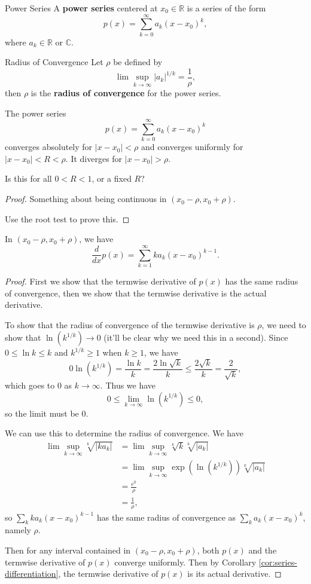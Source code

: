 \documentclass[10pt]{report}
\begin{document}
\begin{defn}{Power Series}{}
A \textbf{power series} centered at $x_0 \in \mathbb{R}$ is a series of the form
\[
	p(x) = \sum_{k=0}^{\infty} a_k (x-x_0)^k,
\] where $a_k \in \mathbb{R} \text{ or } \mathbb{C}$.
\end{defn}

\begin{defn}{Radius of Convergence}{}
Let $\rho$ be defined by
\[
\lim \sup_{k \to \infty} |a_k|^{1/k} = \frac{1}{\rho},
\] then $\rho$ is the \textbf{radius of convergence} for the power series.
\end{defn}

\begin{thrm}{}{}
The power series
\[
	p(x) = \sum_{k=0}^{\infty} a_k (x-x_0)^k
\] converges absolutely for $|x-x_0|<\rho$ and converges uniformly for $|x-x_0| < R < \rho$. It diverges for $|x-x_0|>\rho$.

{\color{red}Is this for all $0 < R < 1$, or a fixed $R$?}
\end{thrm}
\begin{proof}
	{\color{red}Something about being continuous in $(x_0-\rho, x_0+\rho)$.}

	{\color{red}Use the root test to prove this.}
\end{proof}

\begin{cor}
	In $(x_0-\rho, x_0+\rho)$, we have
	\[
		\frac{d }{d x} p(x) = \sum_{k=1}^{\infty} k a_k (x-x_0)^{k-1}.
	\] 
\end{cor}
\begin{proof}
	First we show that the termwise derivative of $p(x)$ has the same radius of convergence, then we show that the termwise derivative is the actual derivative.

	To show that the radius of convergence of the termwise derivative is $\rho$, we need to show that $\ln(k^{1/k}) \to 0$ (it'll be clear why we need this in a second). Since $0 \leq \ln k \leq k$ and $k^{1/k} \geq 1$ when $k \geq 1$, we have
	\[
		0 \ln(k^{1/k}) = \frac{\ln k}{k} = \frac{2 \ln \sqrt{k} }{k} \leq \frac{2 \sqrt{ k} }{k} = \frac{2}{\sqrt{k} } ,
	\] which goes to 0 as $k \to \infty$. Thus we have
	\[
		0 \leq \lim_{k \to \infty} \ln(k^{1/k}) \leq 0,
	\] so the limit must be 0.

	We can use this to determine the radius of convergence. We have
	\begin{align*}
		\lim\sup_{k \to \infty} \sqrt[k]{|k a_k|} &= \lim\sup_{k \to \infty} \sqrt[k]{k} \sqrt[k]{|a_k|} \\
							  &= \lim\sup_{k \to \infty} \exp(\ln(k^{1/k})) \sqrt[k]{|a_k|} \\
							  &= \frac{e^{0}}{\rho} \\
							  &= \frac{1}{\rho},
	\end{align*}
	so $\sum_k k a_k (x-x_0)^{k-1}$ has the same radius of convergence as $\sum_k a_k (x-x_0)^k$, namely $\rho$.

	Then for any interval contained in $(x_0-\rho, x_0+\rho)$, both $p(x)$ and the termwise derivative of $p(x)$ converge uniformly. Then by Corollary \ref{cor:series-differentiation}, the termwise derivative of $p(x)$ is its actual derivative.
\end{proof}
\end{document}
